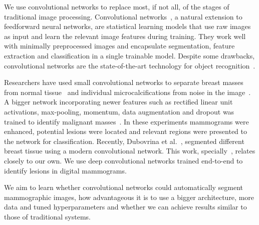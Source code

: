 We use convolutional networks to replace most, if not all, of the stages of traditional image processing. 
Convolutional networks~\cite{Fukushima1980,LeCun1998}, a natural extension to feedforward neural networks, are statistical learning models that use raw images as input and learn the relevant image features during training. They work well with minimally preprocessed images and encapsulate segmentation, feature extraction and classification in a single trainable model. Despite some drawbacks, convolutional networks are the state-of-the-art technology for object recognition~\cite{Russakovsky2015}.

Researchers have used small convolutional networks to separate breast masses from normal tissue~\cite{Sahiner1996} and individual microcalcifications from noise in the image~\cite{Lo1995, Ge2007}. A bigger network incorporating newer features such as rectified linear unit activations, max-pooling, momentum, data augmentation and dropout was trained to identify malignant masses~\cite{Arevalo2015}. In these experiments mammograms were enhanced, potential lesions were located and relevant regions were presented to the network for classification.
Recently, Dubovrina et al.~\cite{Dubrovina2015}, segmented different breast tissue using a modern convolutional network. This work, specially~\cite{Arevalo2015, Dubrovina2015}, relates closely to our own. We use deep convolutional networks trained end-to-end to identify lesions in digital mammograms.%

We aim to learn whether convolutional networks could automatically segment mammographic images, how advantageous it is to use a bigger architecture, more data and tuned hyperparameters and whether we can achieve results similar to those of traditional systems.

